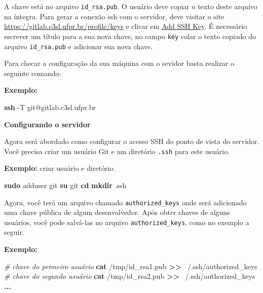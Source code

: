 \documentclass[
  a5paper,
  pagesize,
  9pt,
  pointlessnumbers,
  normalheadings,
  twoside=false
]{book}
\newenvironment{Shaded}{\begin{snugshade}}{\end{snugshade}}
\newcommand{\KeywordTok}[1]{\textcolor[rgb]{0.13,0.29,0.53}{\textbf{{#1}}}}
\newcommand{\CommentTok}[1]{\textcolor[rgb]{0.56,0.35,0.01}{\textit{{#1}}}}
\newcommand{\NormalTok}[1]{{#1}}
\begin{document}
A chave está no arquivo \texttt{id\_rsa.pub}. O usuário deve copiar o
texto deste arquivo na íntegra. Para gerar a conexão ssh com o servidor,
deve visitar o site
\href{https://gitlab.c3sl.ufpr.br/profile/keys}{\url{https://gitlab.c3sl.ufpr.br/profile/keys}}
e clicar em \href{https://gitlab.c3sl.ufpr.br/profile/keys/new}{Add SSH
Key}. É necessário escrever um título para a sua nova chave, no campo
\texttt{key} colar o texto copiado do arquivo \texttt{id\_rsa.pub} e
adicionar sua nova chave.

Para checar a configuração da sua máquina com o sevidor basta realizar o
seguinte comando:

\textbf{Exemplo:}

\begin{Shaded}
\begin{Highlighting}[]
\KeywordTok{ssh} \NormalTok{-T git@gitlab.c3sl.ufpr.br}
\end{Highlighting}
\end{Shaded}

\textbf{Configurando o servidor}

Agora será abordado como configurar o acesso SSH do ponto de vista do
servidor. Você precisa criar um usuário Git e um diretório \texttt{.ssh}
para este usuário.

\textbf{Exemplo:} criar usuário e diretório.

\begin{Shaded}
\begin{Highlighting}[]
\KeywordTok{sudo} \NormalTok{adduser git}
\KeywordTok{su} \NormalTok{git}
\KeywordTok{cd}
\KeywordTok{mkdir} \NormalTok{.ssh}
\end{Highlighting}
\end{Shaded}

Agora, você terá um arquivo chamado \texttt{authorized\_keys} onde será
adicionado uma chave pública de algum desenvolvedor. Após obter chaves
de alguns usuários, você pode salvá-las no arquivo
\texttt{authorized\_keys}, como no exemplo a seguir.

\textbf{Exemplo:}

\begin{Shaded}
\begin{Highlighting}[]
\CommentTok{# chave do primeiro usuário}
\KeywordTok{cat} \NormalTok{/tmp/id_rsa1.pub }\KeywordTok{>>} \NormalTok{~/.ssh/authorized_keys}
\CommentTok{# chave do segundo usuário}
\KeywordTok{cat} \NormalTok{/tmp/id_rsa2.pub }\KeywordTok{>>} \NormalTok{~/.ssh/authorized_keys}
\KeywordTok{...}
\end{Highlighting}
\end{Shaded}
\end{document}
